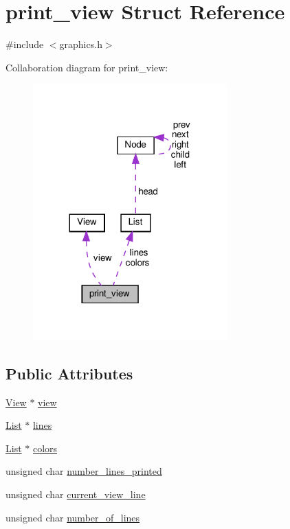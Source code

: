 \hypertarget{structprint__view}{}\section{print\+\_\+view Struct Reference}
\label{structprint__view}


{\ttfamily \#include $<$graphics.\+h$>$}



Collaboration diagram for print\+\_\+view\+:\nopagebreak
\begin{figure}[H]
\begin{center}
\leavevmode
\includegraphics[width=212pt]{structprint__view__coll__graph}
\end{center}
\end{figure}
\subsection*{Public Attributes}
\begin{DoxyCompactItemize}
\item 
\hyperlink{structView}{View} $\ast$ \hyperlink{structprint__view_a189a4274f84ccdacb6210281d0163c7a}{view}
\item 
\hyperlink{structList}{List} $\ast$ \hyperlink{structprint__view_af78b98b8b676db7c0bf077cf1ac9aebb}{lines}
\item 
\hyperlink{structList}{List} $\ast$ \hyperlink{structprint__view_a58588dfd2ef043a6f042f10a295064e7}{colors}
\item 
unsigned char \hyperlink{structprint__view_a3a02430bd34dc873fc1cc61f7834d20e}{number\+\_\+lines\+\_\+printed}
\item 
unsigned char \hyperlink{structprint__view_ad5678744072375331613d2775773c933}{current\+\_\+view\+\_\+line}
\item 
unsigned char \hyperlink{structprint__view_a8f1ab6ae1c7d65a6535ce9cc3fa128b1}{number\+\_\+of\+\_\+lines}
\end{DoxyCompactItemize}


